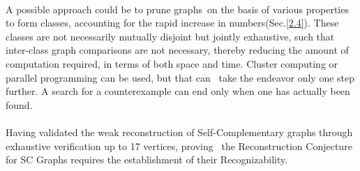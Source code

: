 \documentclass[12pt,conference]{IEEEtran}
\begin{document}
\paragraph*{} A possible approach could be to prune graphs on the basis of various properties to form classes, accounting for the rapid increase in numbers(Sec.\ref{2.4}). These classes are not necessarily mutually disjoint but jointly exhaustive, such that inter-class graph comparisons are not necessary, thereby reducing the amount of computation required, in terms of both space and time. Cluster computing or parallel programming can be used, but that can  take the endeavor only one step further. A search for a counterexample can end only when one has actually been found. 
\paragraph*{} Having validated the weak reconstruction of Self-Complementary graphs through exhaustive verification up to 17 vertices, proving  the Reconstruction Conjecture for SC Graphs requires the establishment of their Recognizability. 
\end{document}
